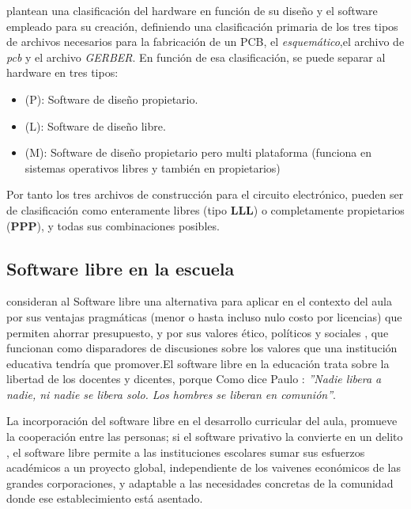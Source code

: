 \citet{gonzalez_hardware_2003} plantean una clasificación del hardware en función de su diseño y el software empleado para su creación, definiendo una clasificación primaria de los tres tipos de archivos necesarios para la fabricación de un PCB, el \textit{esquemático},el archivo de  \textit{pcb} y el archivo \textit{GERBER}. En función de esa clasificación, se puede separar al hardware en tres tipos:

\begin{itemize}
   \item (P): Software de diseño propietario.
   \item (L): Software de diseño libre.
   \item (M): Software de diseño propietario pero multi plataforma (funciona en sistemas operativos libres y también en propietarios)
 \end{itemize} 

Por tanto los tres archivos de construcción para el circuito electrónico, pueden ser de clasificación como enteramente libres (tipo \textbf{LLL}) o completamente propietarios (\textbf{PPP}), y todas sus combinaciones posibles.


\subsection{Software libre en la escuela}

\citet{adell_software_2007} consideran al Software libre una alternativa para aplicar en el contexto del aula por sus ventajas pragmáticas (menor o hasta incluso nulo costo por licencias) que permiten ahorrar presupuesto, y por sus valores ético, políticos y sociales \citep{hart_open_2003}, que funcionan como disparadores de discusiones sobre los valores que una institución educativa tendría que promover.El software libre en la educación trata sobre la libertad de los docentes y dicentes, porque Como dice Paulo \citet{freire_pedagogioprimido._2015}: \textit{''Nadie libera a nadie, ni nadie se libera solo. Los hombres se liberan en comunión''}.

La incorporación del software libre en el desarrollo curricular del aula, promueve la cooperación entre las personas; si el software privativo la convierte en un delito \citep{adell_software_2007}, el software libre permite a las instituciones escolares sumar sus esfuerzos académicos a un proyecto global, independiente de los vaivenes económicos de las grandes corporaciones, y adaptable a las necesidades concretas de la comunidad donde ese establecimiento está asentado.

